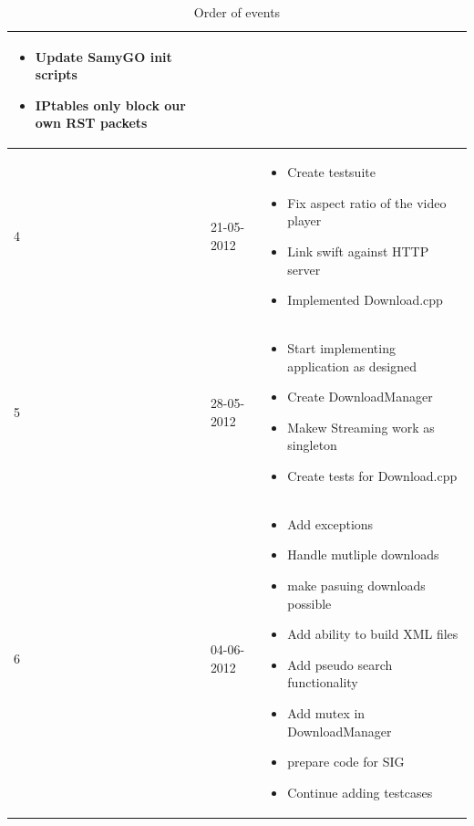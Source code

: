 \begin{table}
\begin{tabular}{| l | l | p{8 cm} |}
\begin{itemize}
								\item Update SamyGO init scripts
								\item IPtables only block our own RST packets
							\end{itemize} \\
		\hline
		4 & 21-05-2012 &		\begin{itemize}
								\item Create testsuite
								\item Fix aspect ratio of the video player
								\item Link swift against HTTP server
								\item Implemented Download.cpp
							\end{itemize} \\
		\hline
		5 & 28-05-2012 &		\begin{itemize}
								\item Start implementing application as designed
								\item Create DownloadManager
								\item Makew Streaming work as singleton
								\item Create tests for Download.cpp
							\end{itemize} \\
		\hline
		6 & 04-06-2012 &		\begin{itemize}
								\item Add exceptions
								\item Handle mutliple downloads
								\item make pasuing downloads possible
								\item Add ability to build XML files
								\item Add pseudo search functionality
								\item Add mutex in DownloadManager
								\item prepare code for SIG
								\item Continue adding testcases
							\end{itemize} \\
		\hline
\end{tabular}
\caption{Order of events}
\label{tab:planning}
\end{table}

